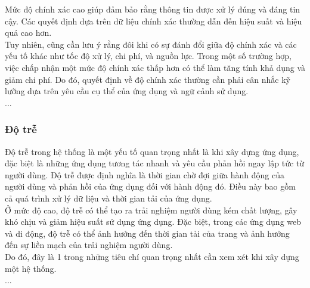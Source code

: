 Mức độ chính xác cao giúp đảm bảo rằng thông tin được xử lý đúng và đáng tin cậy.  Các quyết định dựa trên dữ liệu chính xác thường dẫn đến hiệu suất và hiệu quả cao hơn.\\

Tuy nhiên, cũng cần lưu ý rằng đôi khi có sự đánh đổi giữa độ chính xác và các yếu tố khác như tốc độ xử lý, chi phí, và nguồn lực. Trong một số trường hợp, việc chấp nhận một mức độ chính xác thấp hơn có thể làm tăng tính khả dụng và giảm chi phí. Do đó, quyết định về độ chính xác thường cần phải cân nhắc kỹ lưỡng dựa trên yêu cầu cụ thể của ứng dụng và ngữ cảnh sử dụng. \\

...
\subsubsection{Độ trễ}
Độ trễ trong hệ thống là một yếu tố quan trọng nhất là khi xây dựng ứng dụng, đặc biệt là những ứng dụng tương tác nhanh và yêu cầu phản hồi ngay lập tức từ người dùng. Độ trễ được định nghĩa là thời gian chờ đợi giữa hành động của người dùng và phản hồi của ứng dụng đối với hành động đó. Điều này bao gồm cả quá trình xử lý dữ liệu và thời gian tải của ứng dụng. \\

Ở mức độ cao, độ trễ có thể tạo ra trải nghiệm người dùng kém chất lượng, gây khó chịu và giảm hiệu suất sử dụng ứng dụng. Đặc biệt, trong các ứng dụng web và di động, độ trễ có thể ảnh hưởng đến thời gian tải của trang và ảnh hưởng đến sự liền mạch của trải nghiệm người dùng.\\

Do đó, đây là 1 trong những tiêu chí quan trọng nhất cần xem xét khi xây dựng một hệ thống. \\

...
